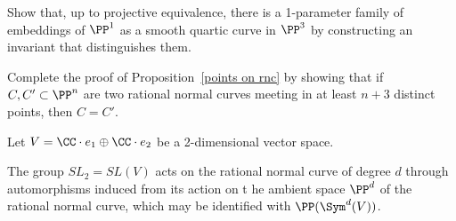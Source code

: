 \begin{exercise}\label{distinguishing rational quartics}
Show that, up to projective equivalence, there is a 1-parameter family of embeddings of $\PP^1$ as a 
smooth quartic curve in $\PP^3$ 
by constructing an invariant that distinguishes them. 
\end{exercise}

\begin{exercise}\label{Castelnuovo uniqueness}
Complete the proof of Proposition~\ref{points on rnc} by showing that if $C, C' \subset \PP^n$ are two rational normal curves meeting in at least $n+3$ distinct points, then $C = C'$. 
\end{exercise}


\begin{exercise}\label{rnc and representations}
Let $V = \CC\cdot e_1\oplus \CC\cdot e_2$ be a 2-dimensional vector space. 

The group $SL_2= SL(V)$ acts on the rational normal curve of degree $d$ through automorphisms induced from its action on
t he ambient space $\PP^d$ of the rational normal curve, which may be identified with $\PP(\Sym^d(V))$.


\end{exercise}
